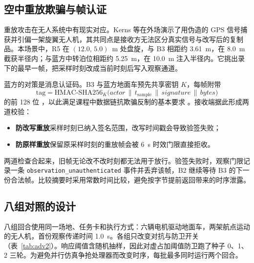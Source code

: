 \subsection{空中重放欺骗与帧认证}\label{sec:adv.3}

重放攻击在无人系统中有现实对应。Kerns 等在外场演示了用伪造的 GPS 信号捕获并引偏一架旋翼无人机\cite{ref17}，其共同点是接收方无法区分真实信号与改写后的复制品。本场景中，R5 在 $(12.0,\,5.0)$~m 处盘旋，与 B3 相距约 3.61~m，在 8.0~m 截获半径内；与蓝方中转泊位相距约 5.25~m，在 10.0~m 注入半径内。它挑出录下的最早一帧，把采样时刻改成当前时刻后写入观察通道。

蓝方的对策是消息认证码。B3 与蓝方地面车预先共享密钥 $K$，每帧附带
\begin{equation}
\mathrm{tag}=\mathrm{HMAC\text{-}SHA256}_{K}\bigl(\textit{actor}\,\|\,t_{\mathrm{sample}}\,\|\,\textit{signature}\,\|\,\textit{bytes}\bigr)\label{eq:hmac}
\end{equation}
的前 128 位 \cite{ref18}，以此满足课程中数据链抗欺骗反制的基本要求 \cite{ref1}。接收端据此形成两道校验：
\begin{itemize}
\item \textbf{防改写重放}\quad 采样时刻已纳入签名范围，改写时间戳会导致验签失败；
\item \textbf{防原样重放}\quad 保留原采样时刻的重放帧会被 6~s 时效门限直接拒收。
\end{itemize}
两道检查合起来，旧帧无论改不改时刻都无法用于放行。验签失败时，观察门限记录一条 \texttt{observation\_unauthenticated} 事件并丢弃该帧，B2 继续等待 B3 的下一份合法帧。比较摘要时采用常数时间比较，避免按字节提前返回带来的时序泄露。

\subsection{八组对照的设计}\label{sec:adv.4}

八组回合使用同一场地、任务卡和执行方式：六辆电机驱动地面车，两架航点运动的无人机，首份观察传递时间 1.0~s。各组只改变对抗与防卫开关（表~\ref{tab:adv2}）。响应阈值含随机抽样，因此对虚占加阈值防卫跑了种子 0、1、2 三轮。为避免并行仿真争抢处理器而改变时序，每批最多同时运行两个回合。

